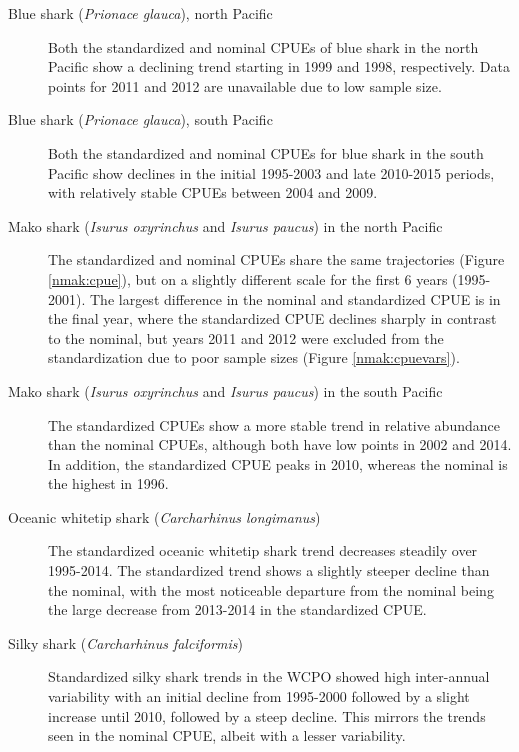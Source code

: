 \documentclass{SCreport}
\begin{document}
 
\begin{description}
\item[Blue shark (\emph{Prionace glauca}), north Pacific] Both the standardized and nominal CPUEs of blue shark in the north Pacific show a declining trend starting in 1999 and 1998, respectively. Data points for 2011 and 2012 are unavailable due to low sample size.  
 
 \item[Blue shark (\emph{Prionace glauca}), south Pacific]  Both the standardized and nominal CPUEs for blue shark in the south Pacific show declines in the initial 1995-2003 and late 2010-2015 periods, with relatively stable CPUEs between 2004  and 2009.  
 
 \item[Mako shark (\emph{Isurus oxyrinchus} and \emph{Isurus paucus}) in the north Pacific] The standardized and nominal CPUEs share the same trajectories (Figure \ref{nmak:cpue}), but on a slightly different scale for the first 6 years (1995-2001).  The largest difference in the nominal and standardized CPUE is in the final year, where the standardized CPUE declines sharply in contrast to the nominal, but years 2011 and 2012 were excluded from the standardization due to poor sample sizes (Figure \ref{nmak:cpuevars}).
 
\item[Mako shark (\emph{Isurus oxyrinchus} and \emph{Isurus paucus}) in the south Pacific] The standardized CPUEs show a more stable trend in relative abundance than the nominal CPUEs, although both have low points in 2002 and 2014. In addition, the standardized CPUE peaks in 2010, whereas the nominal is the highest in 1996.  
 
\item[Oceanic whitetip shark (\emph{Carcharhinus longimanus})] The standardized oceanic whitetip shark trend decreases steadily over 1995-2014.  The standardized trend shows a slightly steeper decline than the nominal, with the most noticeable departure from the nominal being the large decrease from 2013-2014 in the standardized CPUE.%
 
 \item[Silky shark (\emph{Carcharhinus falciformis})] Standardized silky shark trends in the WCPO showed high inter-annual variability with an initial decline from 1995-2000 followed by a slight increase until 2010, followed by a steep decline. This mirrors the trends seen in the nominal CPUE, albeit with a lesser variability.
 

\end{description}
\end{document}
